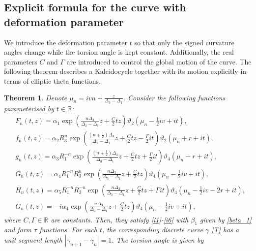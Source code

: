 \documentclass[10pt,leqno]{amsart}
\newcommand{\R}{\mathbb{R}}
\newtheorem{theorem}{Theorem}[section]
\numberwithin{equation}{section}
\begin{document}
\subsection{Explicit formula for the curve with deformation parameter}\label{subsection:Explicit formula of the discrete curve with deformation parameter}
We introduce the deformation parameter $t$ so that only the signed curvature angles change while the torsion angle is kept constant.
Additionally, the real parameters $C$ and $\Gamma$ are introduced to control the global motion of the curve.
The following theorem describes a Kaleidocycle together with its motion explicitly in terms of elliptic theta functions.
\begin{theorem}\label{thm:PhDKal2}
Denote $\mu_{n}=ivn+\frac{z}{\Delta_{3}-\Delta_{1}}$. Consider the following functions parameterised by $t\in \R$:
\begin{align}\label{t}
&F_{n}(t, z)=\alpha_1\exp\left(\frac{n\Delta_{3}}{\Delta_{3}-\Delta_{1}}z+\frac{C}{2}tz\right)\vartheta_2\left(\mu_{n}-\frac{1}{2}iv+it\right),\\
&f_{n}(t, z)=\alpha_2 R_{3}^{n}\exp\left(\frac{\left(n+\frac{1}{2}\right)\Delta_{3}}{\Delta_{3}-\Delta_{1}}z+\frac{C}{2}tz-\frac{\Gamma}{2} it\right)\vartheta_2\left(\mu_{n}+r+it\right), \nonumber\\
&g_{n}(t, z)=\alpha_3 R_{1}^{-n}\exp\left(\frac{\left(n+\frac{1}{2}\right)\Delta_{3}}{\Delta_{3}-\Delta_{1}}z+\frac{C}{2}tz+\frac{\Gamma}{2} it\right)\vartheta_4\left(\mu_{n}-r+it\right), \nonumber\\
&G_{n}(t, z)=\alpha_4 R_{1}^{-n}R_{3}^{n}\exp\left(\frac{n\Delta_{3}}{\Delta_{3}-\Delta_{1}}z+\frac{C}{2}tz\right)\vartheta_4\left(\mu_{n}-\frac{1}{2}iv+it\right), \nonumber\\
&H_{n}(t, z)=\alpha_5 R_{1}^{-n}R_{3}^{-n}\exp\left(\frac{n\Delta_{3}}{\Delta_{3}-\Delta_{1}}z+\frac{C}{2}tz+\Gamma it\right)\vartheta_4\left(\mu_{n}-\frac{1}{2}iv-2r+it\right), \nonumber\\
&\widetilde{G}_{n}(t, z)=-i\alpha_4 \exp\left(\frac{n\Delta_{3}}{\Delta_{3}-\Delta_{1}}z+\frac{C}{2}tz\right)\vartheta_4\left(\mu_{n}-\frac{1}{2}iv+it\right),\nonumber
\end{align}
where $C, \Gamma\in\mathbb{R}$ are constants.
Then, they satisfy \eqref{i1}-\eqref{i6} with $\beta_{1}$ given by \eqref{beta_1} and form $\tau$ functions.
For each $t$,
the corresponding discrete curve $\gamma$ \eqref{T} has a unit segment length $\left|\gamma_{n+1}-\gamma_{n}\right|=1$.
The torsion angle is given by
\begin{equation}\label{lam2}

\end{equation}
\end{theorem}
\end{document}
